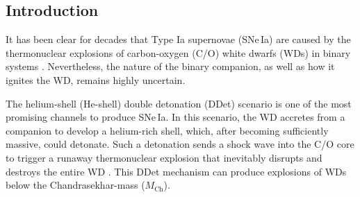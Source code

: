 \documentclass[twocolumn]{aastex631}
\newcommand{\sn}{SN\,2020jgb}
\newcommand{\Mch}{$M_\mathrm{Ch}$}
\begin{document}
\begin{CJK*}{UTF8}{gbsn}
\begin{abstract} 
%
The detonation of a thin ($\lesssim$0.03\,$\mathrm{M_\odot}$) helium shell (He-shell) atop a white dwarf (WD) is a promising mechanism to explain normal Type Ia supernovae (SNe\,Ia), while thicker He-shells ($>$0.03\,$\mathrm{M_\odot}$) may explain some recently observed peculiar SNe\,Ia. We present observations of \sn, a peculiar SN\,Ia discovered by the Zwicky Transient Facility (ZTF). Near maximum light, \sn\ is subluminous (ZTF $g$-band absolute magnitude $M_g\approx -18.2$\,mag) and shows an unusually red color ($g_\mathrm{ZTF}-r_\mathrm{ZTF}\approx 0.4$\,mag) due to the strong line-blanketing blueward of $\sim$5000\,\AA. These properties resemble those of SN\,2018byg, a peculiar SN\,Ia consistent with a ``thick He-shell'' double detonation (DDet) SN. Using detailed radiative transfer models, we show that the optical spectroscopic and photometric evolution of \sn\ are broadly consistent with a He-shell of $\sim$0.08\,$\mathrm{M_\odot}$ detonating above a carbon-oxygen WD of $\sim$0.87\,$\mathrm{M_\odot}$. We detect a prominent absorption feature at $\sim$1\,\micron\ in the near-infrared (NIR) spectrum of \sn, which could originate from the unburnt helium in the outermost ejecta. While the sample size is limited, similar 1\,\micron\ features have been detected in all the thick He-shell DDet candidates with NIR spectra obtained to date. \sn\ is also the first thick He-shell DDet SN discovered in a star-forming galaxy, indisputably showing that He-shell DDet objects occur in both star-forming and passive galaxies, consistent with the normal SN\,Ia population.
%
\end{abstract}


\section{Introduction} \label{sec:intro}
It has been clear for decades that Type Ia supernovae (SNe\,Ia) are caused by the thermonuclear explosions of carbon-oxygen (C/O) white dwarfs (WDs) in binary systems \citep[see][for a review]{Maoz_2014}. Nevertheless, the nature of the binary companion, as well as how it ignites the WD, remains highly uncertain. 

The helium-shell (He-shell) double detonation (DDet) scenario is one of the most promising channels to produce SNe\,Ia. In this scenario, the WD accretes from a companion to develop a helium-rich shell, which, after becoming sufficiently massive, could detonate. Such a detonation sends a shock wave into the C/O core to trigger a runaway thermonuclear explosion that inevitably disrupts and destroys the entire WD \citep{Nomoto_1982a, Nomoto_1982b, Woosley_1986, Livne_1990, Woosley_1994, Livne_1995}. This DDet mechanism can produce explosions of WDs below the Chandrasekhar-mass (\Mch).


\end{CJK*}
\end{document}
